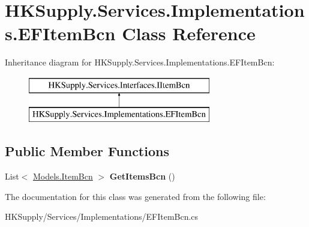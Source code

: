 \hypertarget{class_h_k_supply_1_1_services_1_1_implementations_1_1_e_f_item_bcn}{}\section{H\+K\+Supply.\+Services.\+Implementations.\+E\+F\+Item\+Bcn Class Reference}
\label{class_h_k_supply_1_1_services_1_1_implementations_1_1_e_f_item_bcn}
Inheritance diagram for H\+K\+Supply.\+Services.\+Implementations.\+E\+F\+Item\+Bcn\+:\begin{figure}[H]
\begin{center}
\leavevmode
\includegraphics[height=2.000000cm]{class_h_k_supply_1_1_services_1_1_implementations_1_1_e_f_item_bcn}
\end{center}
\end{figure}
\subsection*{Public Member Functions}
\begin{DoxyCompactItemize}
\item 
\mbox{\label{class_h_k_supply_1_1_services_1_1_implementations_1_1_e_f_item_bcn_a6d513ae8f1148a20be50f2bf93b04385}} 
List$<$ \mbox{\hyperlink{class_h_k_supply_1_1_models_1_1_item_bcn}{Models.\+Item\+Bcn}} $>$ {\bfseries Get\+Items\+Bcn} ()
\end{DoxyCompactItemize}


The documentation for this class was generated from the following file\+:\begin{DoxyCompactItemize}
\item 
H\+K\+Supply/\+Services/\+Implementations/E\+F\+Item\+Bcn.\+cs\end{DoxyCompactItemize}
